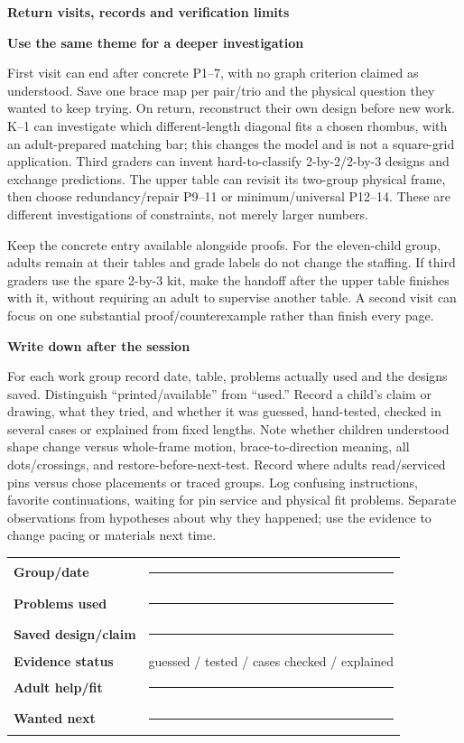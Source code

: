 \documentclass[letterpaper,11pt]{article}
\newcommand{\titleline}[1]{\par{\large\bfseries #1}\par}
\newcommand{\sub}[1]{\par\textbf{#1}\par}
\begin{document}
\newpage
\titleline{Return visits, records and verification limits}
\sub{Use the same theme for a deeper investigation}
First visit can end after concrete P1--7, with no graph criterion claimed as understood. Save one brace map per pair/trio and the physical question they wanted to keep trying. On return, reconstruct their own design before new work. K--1 can investigate which different-length diagonal fits a chosen rhombus, with an adult-prepared matching bar; this changes the model and is not a square-grid application. Third graders can invent hard-to-classify 2-by-2/2-by-3 designs and exchange predictions. The upper table can revisit its two-group physical frame, then choose redundancy/repair P9--11 or minimum/universal P12--14. These are different investigations of constraints, not merely larger numbers.

Keep the concrete entry available alongside proofs. For the eleven-child group, adults remain at their tables and grade labels do not change the staffing. If third graders use the spare 2-by-3 kit, make the handoff after the upper table finishes with it, without requiring an adult to supervise another table. A second visit can focus on one substantial proof/counterexample rather than finish every page.

\sub{Write down after the session}
For each work group record date, table, problems actually used and the designs saved. Distinguish ``printed/available'' from ``used.'' Record a child's claim or drawing, what they tried, and whether it was guessed, hand-tested, checked in several cases or explained from fixed lengths. Note whether children understood shape change versus whole-frame motion, brace-to-direction meaning, all dots/crossings, and restore-before-next-test. Record where adults read/serviced pins versus chose placements or traced groups. Log confusing instructions, favorite continuations, waiting for pin service and physical fit problems. Separate observations from hypotheses about why they happened; use the evidence to change pacing or materials next time.

\begin{tabularx}{\linewidth}{@{}lX@{}}\textbf{Group/date} & \rule{.8\linewidth}{.3pt}\\[8pt]
\textbf{Problems used} & \rule{.8\linewidth}{.3pt}\\[8pt]
\textbf{Saved design/claim} & \rule{.8\linewidth}{.3pt}\\[8pt]
\textbf{Evidence status} & guessed / tested / cases checked / explained\\[8pt]
\textbf{Adult help/fit} & \rule{.8\linewidth}{.3pt}\\[8pt]
\textbf{Wanted next} & \rule{.8\linewidth}{.3pt}
\end{tabularx}
\end{document}
